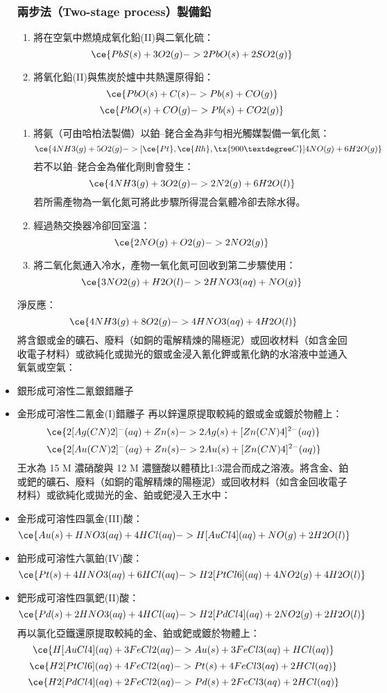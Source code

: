 \documentclass[a4paper,12pt]{report}
\begin{document}
\begin{itemize}
\subsubsection{兩步法（Two-stage process）製備鉛}
\begin{enumerate}
\item 將在空氣中燃燒成氧化鉛(II)與二氧化硫：
\[\ce{PbS(s) + 3O2(g) -> 2PbO(s) + 2SO2(g)}\]
\item 將氧化鉛(II)與焦炭於爐中共熱還原得鉛：
\[\ce{PbO(s) + C(s) -> Pb(s) + CO(g)}\]
\[\ce{PbO(s) + CO(g) -> Pb(s) + CO2(g)}\]
\end{enumerate}
\begin{enumerate}
\item 將氨（可由哈柏法製備）以鉑–銠合金為非勻相光觸媒製備一氧化氮：
\[\ce{4NH3(g) + 5O2(g) ->[\ce{Pt}, \ce{Rh},\tx{900°C}] 4NO(g) + 6H2O(g)}\]
若不以鉑–銠合金為催化劑則會發生：
\[\ce{4NH3(g) + 3O2(g) -> 2N2(g) + 6H2O(l)}\]
若所需產物為一氧化氮可將此步驟所得混合氣體冷卻去除水得。
\item 經過熱交換器冷卻回室溫：
\[\ce{2NO(g) + O2(g) -> 2NO2(g)}\]
\item 將二氧化氮通入冷水，產物一氧化氮可回收到第二步驟使用：
\[\ce{3NO2(g) + H2O(l) -> 2HNO3(aq) + NO(g)}\]
\end{enumerate}
淨反應：
\[\ce{4NH3(g) + 8O2(g) -> 4HNO3(aq) + 4H2O(l)}\]
將含銀或金的礦石、廢料（如銅的電解精煉的陽極泥）或回收材料（如含金回收電子材料）或欲純化或拋光的銀或金浸入氰化鉀或氰化鈉的水溶液中並通入氧氣或空氣：
\bit
\item 銀形成可溶性二氰銀錯離子\ce{[Ag(CN)2]-}
\item 金形成可溶性二氰金(I)錯離子\ce{[Au(CN)2]-}
\eit
再以鋅還原提取較純的銀或金或鍍於物體上：
\[\ce{2[Ag(CN)2]^-(aq) + Zn(s) -> 2Ag(s) + [Zn(CN)4]^{2-}(aq)}\]
\[\ce{2[Au(CN)2]^-(aq) + Zn(s) -> 2Au(s) + [Zn(CN)4]^{2-}(aq)}\]
王水為 15 M 濃硝酸與 12 M 濃鹽酸以體積比1:3混合而成之溶液。將含金、鉑或鈀的礦石、廢料（如銅的電解精煉的陽極泥）或回收材料（如含金回收電子材料）或欲純化或拋光的金、鉑或鈀浸入王水中：
\bit
\item 金形成可溶性四氯金(III)酸：
\[\ce{Au(s) + HNO3(aq) + 4HCl(aq) -> H[AuCl4](aq) + NO(g) + 2H2O(l)}\]
\item 鉑形成可溶性六氯鉑(IV)酸：
\[\ce{Pt(s) + 4HNO3(aq) + 6HCl(aq) -> H2[PtCl6](aq) + 4NO2(g) + 4H2O(l)}\]
\item 鈀形成可溶性四氯鈀(II)酸：
\[\ce{Pd(s) + 2HNO3(aq) + 4HCl(aq) -> H2[PdCl4](aq) + 2NO2(g) + 2H2O(l)}\]
\eit
再以氯化亞鐵還原提取較純的金、鉑或鈀或鍍於物體上：
\[\ce{H[AuCl4](aq) + 3FeCl2(aq) -> Au(s) + 3FeCl3(aq) + HCl(aq)}\]
\[\ce{H2[PtCl6](aq) + 4FeCl2(aq) -> Pt(s) + 4FeCl3(aq) + 2HCl(aq)}\]
\[\ce{H2[PdCl4](aq) + 2FeCl2(aq) -> Pd(s) + 2FeCl3(aq) + 2HCl(aq)}\]

\end{itemize}
\end{document}
